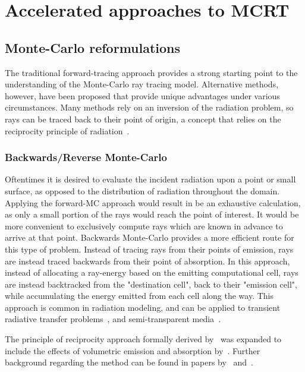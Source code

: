 \section{Accelerated approaches to MCRT}

\subsection{Monte-Carlo reformulations}
The traditional forward-tracing approach provides a strong starting point to the understanding of the Monte-Carlo ray tracing model. Alternative methods, however, have been proposed that provide unique advantages under various circumstances.
Many methods rely on an inversion of the radiation problem, so rays can be traced back to their point of origin, a concept that relies on the reciprocity principle of radiation~\cite{Case1957TransferPrinciple}.

\subsubsection{Backwards/Reverse Monte-Carlo}
Oftentimes it is desired to evaluate the incident radiation upon a point or small surface, as opposed to the distribution of radiation throughout the domain.
Applying the forward-MC approach would result in be an exhaustive calculation, as only a small portion of the rays would reach the point of interest. It would be more convenient to exclusively compute rays which are known in advance to arrive at that point. 
Backwards Monte-Carlo provides a more efficient route for this type of problem.
Instead of tracing rays from their points of emission, rays are instead traced backwards from their point of absorption.
In this approach, instead of allocating a ray-energy based on the emitting computational cell, rays are instead backtracked from the "destination cell", back to their "emission cell", while accumulating the energy emitted from each cell along the way.
This approach is common in radiation modeling, and can be applied to transient radiative transfer problems~\cite{Lu2004ReverseMedia}, and semi-transparent media~\cite{Li2005BackwardSlab}.

The principle of reciprocity approach formally derived by~\citet{Case1957TransferPrinciple} was expanded to include the effects of volumetric emission and absorption by~\citet{Walters1992RigorousMedia}.
Further background regarding the method can be found in papers by~\citet{Modest2003BackwardTransfer} and~\citet{Howell2010ThermalTransfer}.

